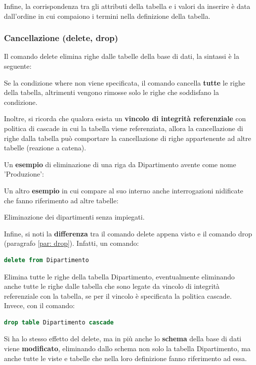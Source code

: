 \documentclass[a4paper]{article}
\begin{document}
	\noindent
	Infine, la corrispondenza tra gli attributi della tabella e i valori da inserire è data dall'ordine in cui compaiono i termini nella definizione della tabella.\newpage
	
	\subsubsection{Cancellazione (\textsf{delete}, \textsf{drop})}
	
	Il comando \textsf{delete} elimina righe dalle tabelle della base di dati, la sintassi è la seguente:
	
	Se la condizione \textsf{where} non viene specificata, il comando cancella \textbf{tutte} le righe della tabella, altrimenti vengono rimosse solo le righe che soddisfano la condizione.
	
	Inoltre, si ricorda che qualora esista un \textbf{vincolo di integrità referenziale} con politica di \textsf{cascade} in cui la tabella viene referenziata, allora la cancellazione di righe dalla tabella può comportare la cancellazione di righe appartenente ad altre tabelle (reazione a catena).\newline
	
	\noindent
	Un \textcolor{Green4}{\textbf{esempio}} di eliminazione di una riga da Dipartimento avente come nome \textsf{'Produzione'}:
	
	Un altro \textcolor{Green4}{\textbf{esempio}} in cui compare al suo interno anche interrogazioni nidificate che fanno riferimento ad altre tabelle:
	
	Eliminazione dei dipartimenti senza impiegati.\newline
	
	\noindent
	Infine, si noti la \textbf{differenza} tra il comando \textsf{delete} appena visto e il comando \textsf{drop} (paragrafo \ref{par: drop}). Infatti, un comando:
\begin{lstlisting}[language=SQL]
delete from Dipartimento\end{lstlisting}
	Elimina tutte le righe della tabella Dipartimento, eventualmente eliminando anche tutte le righe dalle tabella che sono legate da vincolo di integrità referenziale con la tabella, se per il vincolo è specificata la politica \textsf{cascade}.\newline
	Invece, con il comando:
\begin{lstlisting}[language=SQL]
drop table Dipartimento cascade\end{lstlisting}
	Si ha lo stesso effetto del \textsf{delete}, ma in più anche lo \textbf{schema} della base di dati viene \textbf{modificato}, eliminando dallo schema non solo la tabella Dipartimento, ma anche tutte le viste e tabelle che nella loro definizione fanno riferimento ad essa.\newpage
	
\end{document}
